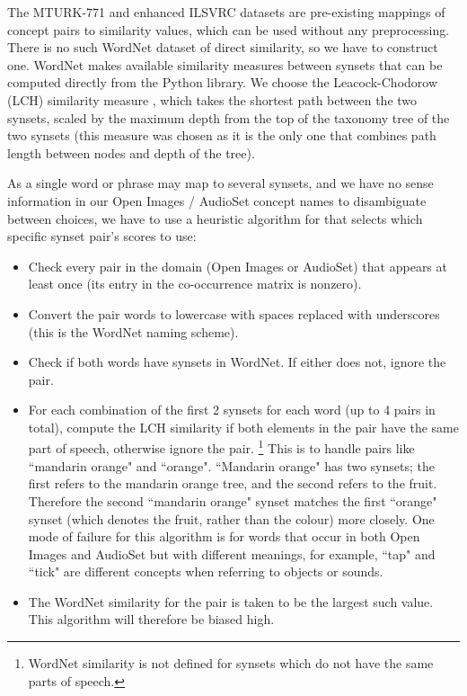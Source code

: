 The MTURK-771 and enhanced ILSVRC datasets are pre-existing mappings of concept pairs to similarity values, which can be used without any preprocessing. There is no such WordNet dataset of direct similarity, so we have to construct one. WordNet makes available similarity measures between synsets that can be computed directly from the Python library. We choose the Leacock-Chodorow (LCH) similarity measure \cite{LeacockChodorow}, which takes the shortest path between the two synsets, scaled by the maximum depth from the top of the taxonomy tree of the two synsets (this measure was chosen as it is the only one that combines path length between nodes and depth of the tree).  

As a single word or phrase may map to several synsets, and we have no sense information in our Open Images / AudioSet concept names to disambiguate between choices, we have to use a heuristic algorithm for that selects which specific synset pair's scores to use:

\begin{itemize}
    \item Check every pair in the domain (Open Images or AudioSet) that appears at least once (its entry in the co-occurrence matrix is nonzero).
    \item Convert the pair words to lowercase with spaces replaced with underscores (this is the WordNet naming scheme).
    \item Check if both words have synsets in WordNet. If either does not, ignore the pair.
    \item For each combination of the first 2 synsets for each word (up to 4 pairs in total), compute the LCH similarity if both elements in the pair have the same part of speech, otherwise ignore the pair. \footnote{WordNet similarity is not defined for synsets which do not have the same parts of speech. } This is to handle pairs like ``mandarin orange" and ``orange". ``Mandarin orange" has two synsets; the first refers to the mandarin orange tree, and the second refers to the fruit. Therefore the second ``mandarin orange" synset matches the first ``orange" synset (which denotes the fruit, rather than the colour) more closely. One mode of failure for this algorithm is for words that occur in both Open Images and AudioSet but with different meanings, for example, ``tap" and ``tick" are different concepts when referring to objects or sounds. 
    \item The WordNet similarity for the pair is taken to be the largest such value. This algorithm will therefore be biased high.
\end{itemize}


